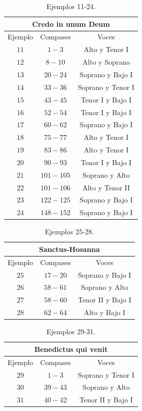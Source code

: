 \documentclass[letterpaper,12pt]{book}
\theoremstyle{definition} \newtheorem{Def}{Definición}[chapter]
\theoremstyle{definition} \newtheorem{Teo}{Teorema}[chapter]
\theoremstyle{definition} \newtheorem{Pro}{Proposición}[chapter]
\theoremstyle{definition} \newtheorem{Lema}{Lema}[chapter]
\begin{document}
\begin{table}[h]
\centering
\begin{tabular}{| c | c | c |}
\hline
\multicolumn{3}{|c|}{Credo in unum Deum}\\
\hline
Ejemplo & Compases & Voces\\
\hline
$11$ & $1-3$ & Alto y Tenor I\\
$12$ & $8-10$ & Alto y Soprano\\
$13$ & $20-24$ & Soprano y Bajo I\\
$14$ & $33-36$ & Soprano y Tenor I\\
$15$ & $43-45$ & Tenor I y Bajo I\\
$16$ & $52-54$ & Tenor I y Bajo I\\
$17$ & $60-62$ & Soprano y Bajo I\\
$18$ & $75-77$ & Alto y Tenor I\\
$19$ & $83-86$ & Alto y Tenor I\\
$20$ & $90-93$ & Tenor I y Bajo I\\
$21$ & $101-105$ & Soprano y Alto\\
$22$ & $101-106$ & Alto y Tenor II\\
$23$ & $122-125$ & Soprano y Bajo I\\
$24$ & $148-152$ & Soprano y Bajo I\\
\hline
\end{tabular}
\caption{\label{Credo}Ejemplos 11-24.}  
\end{table}

\begin{table}[h]
\centering
\begin{tabular}{| c | c | c |}
\hline
\multicolumn{3}{|c|}{Sanctus-Hosanna}\\
\hline
Ejemplo & Compases & Voces\\
\hline
$25$ & $17-20$ & Soprano y Bajo I\\
$26$ & $58-61$ & Soprano y Alto\\
$27$ & $58-60$ & Tenor II y Bajo I\\
$28$ & $62-64$ & Alto y Bajo I\\
\hline
\end{tabular}
\caption{\label{Sanctus}Ejemplos 25-28.}  
\end{table}

\begin{table}[h]
\centering
\begin{tabular}{| c | c | c |}
\hline
\multicolumn{3}{|c|}{Benedictus qui venit}\\
\hline
Ejemplo & Compases & Voces\\
\hline
$29$ & $1-3$ & Soprano y Tenor I\\
$30$ & $39-43$ & Soprano y Alto\\
$31$ & $40-42$ & Tenor II y Bajo I\\
\hline
\end{tabular}
\caption{\label{Benedictus}Ejemplos 29-31.} 
\end{table}
\end{document}
